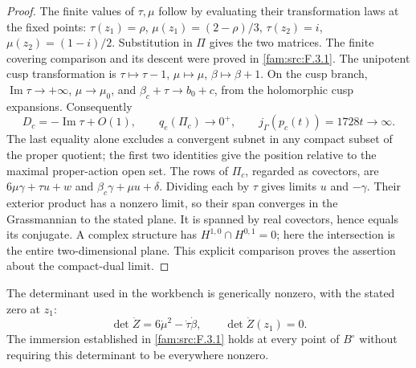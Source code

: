 \begin{proof}
The finite values of $\tau,\mu$ follow by evaluating their transformation
laws at the fixed points: $\tau(z_1)=\rho$,
$\mu(z_1)=(2-\rho)/3$, $\tau(z_2)=i$,
$\mu(z_2)=(1-i)/2$.  Substitution in $\Pi$ gives the two matrices.
The finite covering comparison and its descent were proved in \ref{fam:src:F.3.1}.
The unipotent cusp transformation is
$\tau\mapsto\tau-1$, $\mu\mapsto\mu$, $\beta\mapsto\beta+1$.
On the cusp branch, $\operatorname{Im}\tau\to+\infty$,
$\mu\to\mu_0$, and $\beta_c+\tau\to b_0+c$, from the holomorphic
cusp expansions.  Consequently
\[
 D_c=-\operatorname{Im}\tau+O(1),\qquad
 q_e(\Pi_c)\longrightarrow0^+,
 \qquad j_\Gamma(p_c(t))=1728t\longrightarrow\infty.
\]
The last equality alone excludes a convergent subnet in any compact
subset of the proper quotient; the first two identities give the
position relative to the maximal proper-action open set.
The rows of $\Pi_c$, regarded as covectors, are
$6\mu\gamma+\tau u+w$ and $\beta_c\gamma+\mu u+\delta$.
Dividing each by $\tau$ gives limits $u$ and $-\gamma$.
Their exterior product has a nonzero limit, so their span converges
in the Grassmannian to the stated plane.  It is spanned by real
covectors, hence equals its conjugate.  A complex structure has
$H^{1,0}\cap H^{0,1}=0$; here the intersection is the entire
two-dimensional plane.  This explicit comparison proves the assertion
about the compact-dual limit.
\end{proof}

\begin{proposition}\label{fam:src:F.3.3}\label{fam:st:F.3.3}
The determinant used in the workbench is generically nonzero, with
the stated zero at $z_1$:
\[
 \det\dot Z=6\dot\mu^2-\dot\tau\dot\beta,\qquad
 \det\dot Z(z_1)=0.
\]
The immersion established in \ref{fam:src:F.3.1} holds at every point of $B^\circ$
without requiring this determinant to be everywhere nonzero.
\end{proposition}


